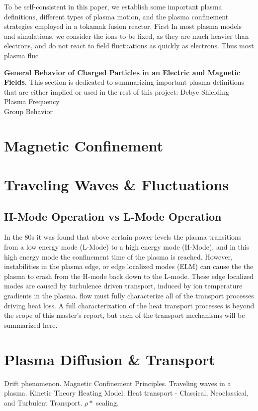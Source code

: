\documentclass{article}
\begin{document}
To be self-consistent in this paper, we establish some important plasma definitions, different types of plasma motion, and the plasma confinement strategies employed in a tokamak fusion reactor. 
First
In most plasma models and simulations, we consider the ions to be fixed, as they are much heavier than electrons, and do not react to field fluctuations as quickly as electrons. Thus most plasma fluc


\textbf{General Behavior of Charged Particles in an Electric and Magnetic Fields.}
This section is dedicated to summarizing important plasma definitions that are either implied or used in the rest of this project:
Debye Shielding\\
Plasma Frequency\\
Group Behavior\\
\section{Magnetic Confinement}

\section{Traveling Waves \& Fluctuations}

\subsection{H-Mode Operation vs L-Mode Operation}

In the 80s it was found that above certain power levels the plasma transitions from a low energy mode (L-Mode) to a high energy mode (H-Mode), and in this high energy mode the confinement time of the plasma is reached. However, instabilities in the plasma edge, or edge localized modes (ELM) can cause the the plasma to crash from the H-mode back down to the L-mode. These edge localized modes are caused by turbulence driven transport, induced by ion temperature gradients in the plasma.  flow must fully characterize all of the transport processes driving heat loss. A full characterization of the heat transport processes is beyond the scope of this master's report, but each of the transport mechanisms will be summarized here.

\section{Plasma Diffusion \& Transport}

Drift phenomenon.
Magnetic Confinement Principles.
Traveling waves in a plasma.
Kinetic Theory
Heating Model.
Heat transport - Classical, Neoclassical, and Turbulent Transport.
$\rho*$ scaling.
\end{document}
